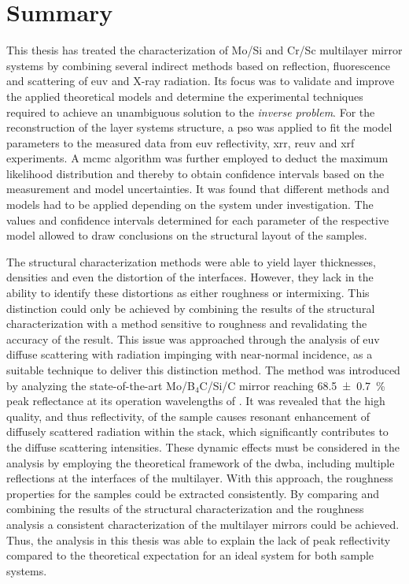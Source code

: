 \glsresetall
\chapter{Summary} \label{ch_summary}
This thesis has treated the characterization of Mo/Si and Cr/Sc multilayer mirror
systems by combining several indirect methods based on reflection, fluorescence
and scattering of \gls{euv} and X-ray radiation.
Its focus was to validate and improve the applied theoretical models and
determine the experimental techniques required to achieve an unambiguous
solution to the \emph{inverse problem}.
For the reconstruction of the layer systems structure, a \gls{pso} was applied
to fit the model parameters to the measured data from \gls{euv} reflectivity,
\gls{xrr}, \gls{reuv} and \gls{xrf} experiments.
A \gls{mcmc} algorithm was further employed to deduct the maximum likelihood
distribution and thereby to obtain confidence intervals based on the measurement
and model uncertainties.
It was found that different methods and models had to be applied depending on
the system under investigation.
The values and confidence intervals determined for each parameter of the
respective model allowed to draw conclusions on the structural layout of the
samples.

The structural characterization methods were able to yield layer thicknesses,
densities and even the distortion of the interfaces.
However, they lack in the ability to identify these distortions as either
roughness or intermixing.
This distinction could only be achieved by combining the results of the
structural characterization with a method sensitive to roughness and
revalidating the accuracy of the result.
This issue was approached through the analysis of \gls{euv} diffuse scattering
with radiation impinging with near-normal incidence, as a suitable technique to
deliver this distinction method.
The method was introduced by analyzing the state-of-the-art Mo/B$_4$C/Si/C
mirror reaching \SI{68.5 \pm 0.7}{\percent} peak reflectance at its operation
wavelengths of .
It was revealed that the high quality, and thus reflectivity, of the sample
causes resonant enhancement of diffusely scattered radiation within the stack,
which significantly contributes to the diffuse scattering intensities.
These dynamic effects must be considered in the analysis by employing the
theoretical framework of the \gls{dwba}, including multiple reflections at the
interfaces of the multilayer.
With this approach, the roughness properties for the samples could be extracted
consistently.
By comparing and combining the results of the structural characterization and
the roughness analysis a consistent characterization of the multilayer mirrors
could be achieved.
Thus, the analysis in this thesis was able to explain the lack of peak
reflectivity compared to the theoretical expectation for an ideal system for
both sample systems.

